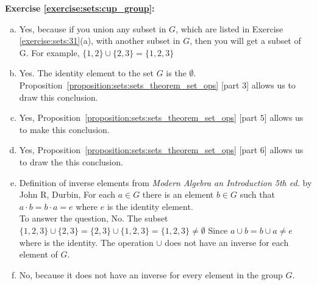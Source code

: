 \noindent\textbf{Exercise \ref{exercise:sets:cup_group}:} %
\begin{enumerate}[(a)]
\item
Yes, because if you union any subset in $G$, which are listed in Exercise \ref{exercise:sets:31}(a), with another subset in $G$, then you will get a subset of G. For example, $\{1,2\}\cup \{2,3\}=\{1,2,3\}$

\item
Yes. The identity element to the set $G$ is the $\emptyset$. Proposition~\ref{proposition:sets:sets_theorem_set_ops} [part $3$] allows us to draw this conclusion.

\item
Yes, Proposition~\ref{proposition:sets:sets_theorem_set_ops} [part $5$] allows us to make this conclusion.

\item
Yes, Proposition~\ref{proposition:sets:sets_theorem_set_ops} [part $6$] allows us to draw the this conclusion.

\item
Definition of inverse elements from \textit{Modern Algebra an Introduction 5th ed.} by John R, Durbin, For each $a\in G$ there is an element $b\in G$ such that $a \cdot b = b \cdot a = e$ where $e$ is the identity element.\\
        
To answer the question, No. The subset $\{1,2,3\}\cup \{2,3\}=\{2,3\}\cup \{1,2,3\}=\{1,2,3\}\neq {\emptyset}$ Since $a\cup b = b\cup a\neq e$ where is the identity. The operation $\cup$ does not have an inverse for each element of $G$.

\item
No, because it does not have an inverse for every element in the group $G$.
\end{enumerate}

